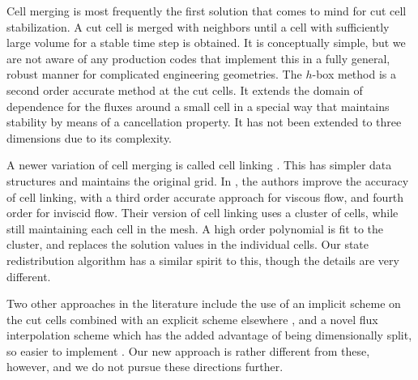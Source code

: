 Cell merging \cite{icm-2003,Chung:2006}  is most frequently the first solution 
that comes to mind for cut cell stabilization. A cut cell is merged with
neighbors until a cell with sufficiently large volume for a stable time
step is obtained. 
It is conceptually simple, but 
we are not aware of any production codes that implement this in a fully
general, robust manner for complicated engineering geometries. 
The $h$-box method \cite{mjb-hel-rjl:hbox2,mjb-hel:hboxsimple}
is a second order accurate method at the cut cells. It extends the 
domain of dependence for the fluxes around a small cell in a 
special way that maintains stability by means of a cancellation
property. It  has not been extended to
three dimensions due to its complexity. 

A newer variation of cell merging is called cell linking \cite{cecereGiacomazzi,
KirkpatrickEtAl:2003, HuKhooAdamsHuang:2006,Chung:2006}.
This has simpler data structures and maintains the original grid. 
In \cite{BalajiMenon:2016}, the authors improve the accuracy of cell linking,
with a third order accurate approach for viscous flow,  and fourth order for 
inviscid flow. 
Their version of cell linking uses a cluster of cells, while still
maintaining each cell in the mesh.  A high order polynomial is fit to
the cluster, and replaces the solution values in the individual cells.
Our state redistribution algorithm has a similar spirit to this, though the 
details are very different. 

Two other approaches in the literature include the use of an implicit
scheme on the cut cells combined with an explicit scheme elsewhere
\cite{May-Berger:JSC}, and a novel flux interpolation scheme which has
the added advantage of being dimensionally split, so easier to
implement \cite{gokhaleNikosKlein:2018}. Our new approach is rather
different from these, however, and we do not pursue these directions
further.


